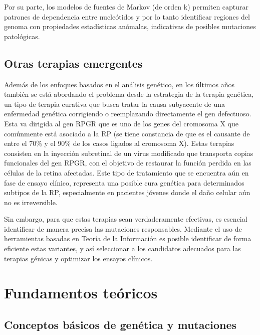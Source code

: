 \documentclass[11pt,spanish,listoffigures,listoftables]{tfgetsinf}
\begin{document}
Por su parte, los modelos de fuentes de Markov (de orden k) permiten capturar patrones de dependencia entre nucleótidos y por lo tanto identificar regiones del genoma con propiedades estadísticas anómalas\cite{VOZ}, indicativas de posibles mutaciones patológicas.

\section{Otras terapias emergentes}

Además de los enfoques basados en el análisis genético, en los últimos años también se está abordando el problema desde la estrategia de la terapia genética, un tipo de terapia curativa que busca tratar la causa subyacente de una enfermedad genética corrigiendo o reemplazando directamente el gen defectuoso. Esta va dirigida al gen RPGR que es uno de los genes del cromosoma X que comúnmente está asociado a la \ac{RP} (se tiene constancia de que es el causante de entre el 70\% y el 90\% de los casos ligados al cromosoma X)\cite{WAN}. Estas terapias consisten en la inyección subretinal de un virus modificado que transporta copias funcionales del gen RPGR, con el objetivo de restaurar la función perdida en las células de la retina afectadas\cite{ZON}. Este tipo de tratamiento que se encuentra aún en fase de ensayo clínico, representa una posible cura genética para determinados subtipos de la \ac{RP}, especialmente en pacientes jóvenes donde el daño celular aún no es irreversible.

Sin embargo, para que estas terapias sean verdaderamente efectivas, es esencial identificar de manera precisa las mutaciones responsables. Mediante el uso de herramientas basadas en Teoría de la Información es posible identificar de forma eficiente estas variantes, y así seleccionar a los candidatos adecuados para las terapias génicas y optimizar los ensayos clínicos.



\chapter{Fundamentos teóricos}

\section{Conceptos básicos de genética y mutaciones}
\end{document}
